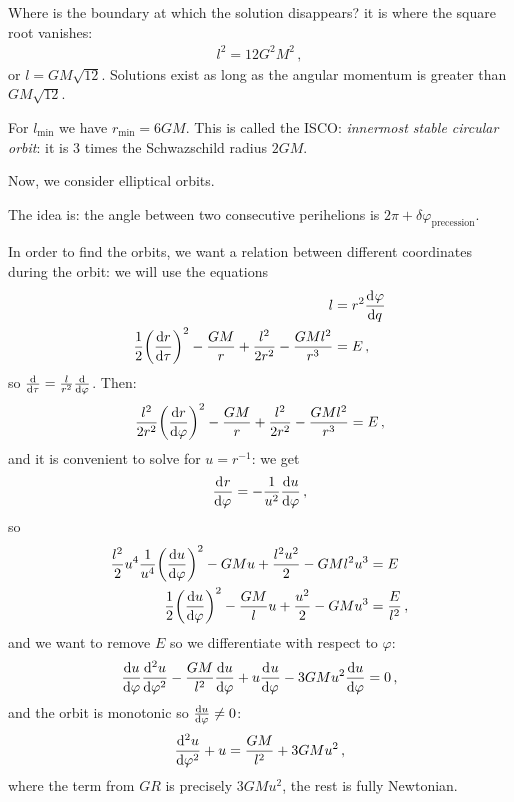 \documentclass[main.tex]{subfiles}
\begin{document}
Where is the boundary at which the solution disappears? it is where the square root vanishes: 
%
\begin{align}
  l^2 = 12 G^2 M^2
\,,
\end{align}
%
or \(l = GM \sqrt{12}\). Solutions exist as long as the angular momentum is greater than \(GM \sqrt{12}\).

For \(l _{\text{min}}\) we have \(r _{\text{min}} = 6 GM\).
This is called the ISCO: \emph{innermost stable circular orbit}: it is \(3\) times the Schwazschild radius \(2GM\).

Now, we consider elliptical orbits.

The idea is: the angle between two consecutive perihelions is \(2\pi + \delta \varphi _{\text{precession}}\).

In order to find the orbits, we want a relation between different coordinates during the orbit: we will use the equations 
%
\begin{subequations}
\begin{align}
  l &= r^2 \dv[]{\varphi }{q}  \\
  \frac{1}{2}\qty(\dv{r}{\tau })^2 - \frac{GM}{r} + \frac{l^2}{2r^2} - \frac{GMl^2}{r^3} &= E 
\,,
\end{align}
\end{subequations}
%
so \(\dv{}{\tau } = \frac{l}{r^2} \dv{}{\varphi }\). Then: 
%
\begin{align}
  \frac{l^2}{2 r^2} \qty(\dv{r}{\varphi })^2 - \frac{GM}{r} + \frac{l^2}{2r^2} - \frac{GMl^2}{r^3} = E
\,,
\end{align}
%
and it is convenient to solve for \(u = r^{-1}\): we get 
%
\begin{align}
  \dv[]{r}{\varphi } = - \frac{1}{u^2} \dv{u }{\varphi }
\,,
\end{align}
%
so 
%
\begin{align}
  \frac{l^2}{2} u^{4} \frac{1}{ u^{4 }} \qty(\dv{u}{\varphi })^2 - GMu + \frac{l^2u^2}{2} - GMl^2u^3 &= E \\
  \frac{1}{2}\qty(\dv{u}{\varphi })^2 - \frac{GM}{l} u + \frac{u^2}{2} - GMu^3 &= \frac{E}{l^2}
\,,
\end{align}
%
and we want to remove \(E\) so we differentiate with respect to \(\varphi \): 
%
\begin{align}
  \dv{u }{\varphi } \dv[2]{u}{\varphi } - \frac{GM}{l^2} \dv{u}{\varphi } + u \dv[]{u}{\varphi } - 3GM u^2 \dv{u}{\varphi } = 0
\,,
\end{align}
%
and the orbit is monotonic so \(\dv{u}{\varphi } \neq 0\): 
%
\begin{align}
  \dv[2]{u}{\varphi } + u = \frac{GM}{l^2} + 3GMu^2
\,,
\end{align}
%
where the term from \(GR\) is precisely \(3GMu^2\), the rest is fully Newtonian.
\end{document}
